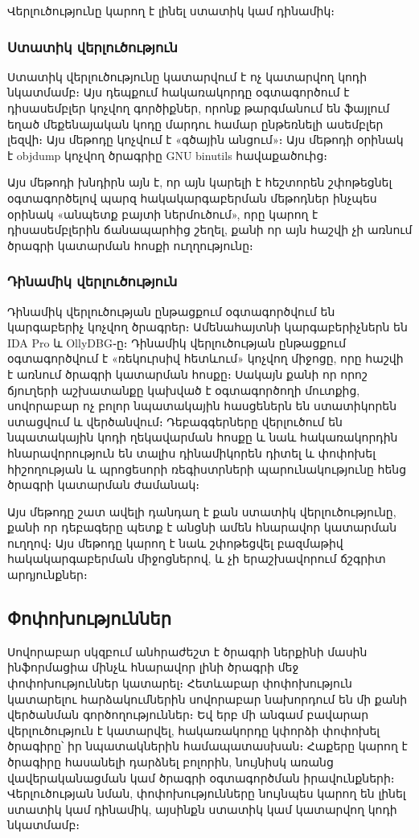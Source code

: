 \documentclass[12pt]{article}
\begin{document}
\begin{sloppypar}
Վերլուծությունը կարող է լինել ստատիկ կամ դինամիկ։

\subsubsection{Ստատիկ վերլուծություն}
Ստատիկ վերլուծությունը կատարվում է ոչ կատարվող կոդի նկատմամբ։ Այս դեպքում
հակառակորդը օգտագործում է դիսասեմբլեր կոչվող գործիքներ, որոնք թարգմանում են
ֆայլում եղած մեքենայական կոդը մարդու համար ընթեռնելի ասեմբլեր լեզվի։ Այս
մեթոդը կոչվում է «գծային անցում»։ Այս մեթոդի օրինակ է objdump կոչվող ծրագրիը
GNU binutils հավաքածուից։

Այս մեթոդի խնդիրն այն է, որ այն կարելի է հեշտորեն շփոթեցնել օգտագործելով
պարզ հակակարգաբերման մեթոդներ ինչպես օրինակ «անպետք բայտի ներմուծում», որը
կարող է դիսասեմբլերին ճանապարհից շեղել, քանի որ այն հաշվի չի առնում
ծրագրի կատարման հոսքի ուղղությունը։

\subsubsection{Դինամիկ վերլուծություն}
Դինամիկ վերլուծության ընթացքում օգտագործվում են կարգաբերիչ կոչվող ծրագրեր։
Ամենահայտնի կարգաբերիչներն են IDA Pro և OllyDBG֊ը։ Դինամիկ վերլուծության
ընթացքում օգտագործվում է «ռեկուրսիվ հետևում» կոչվող միջոցը, որը հաշվի է
առնում ծրագրի կատարման հոսքը։ Սակայն քանի որ որոշ ճյուղերի աշխատանքը
կախված է օգտագործողի մուտքից, սովորաբար ոչ բոլոր նպատակային հասցեներն են
ստատիկորեն ստացվում և վերծանվում։ Դեբագգերները վերլուծում են նպատակային
կոդի ղեկավարման հոսքը և նաև հակառակորդին հնարավորություն են տալիս
դինամիկորեն դիտել և փոփոխել հիշողության և պրոցեսորի ռեգիստրների
պարունակությունը հենց ծրագրի կատարման ժամանակ։

Այս մեթոդը շատ ավելի դանդաղ է քան ստատիկ վերլուծությունը, քանի որ
դեբագերը պետք է անցնի ամեն հնարավոր կատարման ուղղով։ Այս մեթոդը
կարող է նաև շփոթեցվել բազմաթիվ հակակարգաբերման միջոցներով, և
չի երաշխավորում ճշգրիտ արդյունքներ։

\subsection{Փոփոխություններ}
Սովորաբար սկզբում անհրաժեշտ է ծրագրի ներքինի մասին ինֆորմացիա մինչև հնարավոր
լինի ծրագրի մեջ փոփոխություններ կատարել։ Հետևաբար փոփոխություն կատարելու
հարձակումներին սովորաբար նախորդում են մի քանի վերծանման գործողություններ։
Եվ երբ մի անգամ բավարար վերլուծություն է կատարվել, հակառակորդը կփորձի
փոփոխել ծրագիրը՝ իր նպատակներին համապատասխան։ Հաքերը կարող է ծրագիրը
հասանելի դարձնել բոլորին, նույնիսկ առանց վավերականացման կամ ծրագրի օգտագործման
իրավունքների։ Վերլուծության նման, փոփոխությունները նույնպես կարող են
լինել ստատիկ կամ դինամիկ, այսինքն ստատիկ կամ կատարվող կոդի նկատմամբ։


\end{sloppypar}
\end{document}
